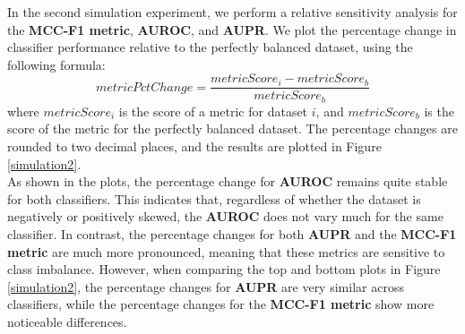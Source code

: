 \documentclass[12pt, oneside]{amsart}
\theoremstyle{definition}
\theoremstyle{remark}
\numberwithin{equation}{section}
\begin{document}
In the second simulation experiment, we perform a relative sensitivity analysis for the \textbf{MCC-F1 metric}, \textbf{AUROC}, and \textbf{AUPR}. We plot the percentage change in classifier performance relative to the perfectly balanced dataset, using the following formula: $$metricPctChange = \frac{metricScore_i - metricScore_b}{metricScore_b}$$ where $metricScore_i$ is the score of a metric for dataset $i$, and $metricScore_b$ is the score of the metric for the perfectly balanced dataset. The percentage changes are rounded to two decimal places, and the results are plotted in Figure \ref{simulation2}. \\

As shown in the plots, the percentage change for \textbf{AUROC} remains quite stable for both classifiers. This indicates that, regardless of whether the dataset is negatively or positively skewed, the \textbf{AUROC} does not vary much for the same classifier. In contrast, the percentage changes for both \textbf{AUPR} and the \textbf{MCC-F1 metric} are much more pronounced, meaning that these metrics are sensitive to class imbalance. However, when comparing the top and bottom plots in Figure \ref{simulation2}, the percentage changes for \textbf{AUPR} are very similar across classifiers, while the percentage changes for the \textbf{MCC-F1 metric} show more noticeable differences.
\end{document}
